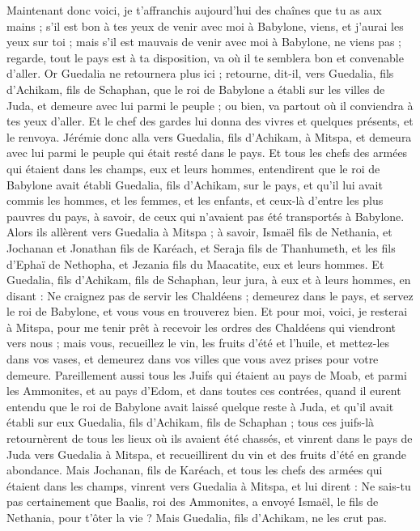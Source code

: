 \begin{multicols}{2}
Maintenant donc voici, je t'affranchis aujourd'hui des chaînes que tu as aux mains ; s'il est bon à tes yeux de venir avec moi à Babylone, viens, et j'aurai les yeux sur toi ; mais s'il est mauvais de venir avec moi à Babylone, ne viens pas ; regarde, tout le pays est à ta disposition, va où il te semblera bon et convenable d'aller.
Or Guedalia ne retournera plus ici ; retourne, dit-il, vers Guedalia, fils d'Achikam, fils de Schaphan, que le roi de Babylone a établi sur les villes de Juda, et demeure avec lui parmi le peuple ; ou bien, va partout où il conviendra à tes yeux d'aller. Et le chef des gardes lui donna des vivres et quelques présents, et le renvoya.
Jérémie donc alla vers Guedalia, fils d'Achikam, à Mitspa, et demeura avec lui parmi le peuple qui était resté dans le pays.
Et tous les chefs des armées qui étaient dans les champs, eux et leurs hommes, entendirent que le roi de Babylone avait établi Guedalia, fils d'Achikam, sur le pays, et qu'il lui avait commis les hommes, et les femmes, et les enfants, et ceux-là d'entre les plus pauvres du pays, à savoir, de ceux qui n'avaient pas été transportés à Babylone.
Alors ils allèrent vers Guedalia à Mitspa ; à savoir, Ismaël fils de Nethania, et Jochanan et Jonathan fils de Karéach, et Seraja fils de Thanhumeth, et les fils d'Ephaï de Nethopha, et Jezania fils du Maacatite, eux et leurs hommes.
Et Guedalia, fils d'Achikam, fils de Schaphan, leur jura, à eux et à leurs hommes, en disant : Ne craignez pas de servir les Chaldéens ; demeurez dans le pays, et servez le roi de Babylone, et vous vous en trouverez bien.
Et pour moi, voici, je resterai à Mitspa, pour me tenir prêt à recevoir les ordres des Chaldéens qui viendront vers nous ; mais vous, recueillez le vin, les fruits d'été et l'huile, et mettez-les dans vos vases, et demeurez dans vos villes que vous avez prises pour votre demeure.
Pareillement aussi tous les Juifs qui étaient au pays de Moab, et parmi les Ammonites, et au pays d'Edom, et dans toutes ces contrées, quand il eurent entendu que le roi de Babylone avait laissé quelque reste à Juda, et qu'il avait établi sur eux Guedalia, fils d'Achikam, fils de Schaphan ;
tous ces juifs-là retournèrent de tous les lieux où ils avaient été chassés, et vinrent dans le pays de Juda vers Guedalia à Mitspa, et recueillirent du vin et des fruits d'été en grande abondance.
Mais Jochanan, fils de Karéach, et tous les chefs des armées qui étaient dans les champs, vinrent vers Guedalia à Mitspa,
et lui dirent : Ne sais-tu pas certainement que Baalis, roi des Ammonites, a envoyé Ismaël, le fils de Nethania, pour t'ôter la vie ? Mais Guedalia, fils d'Achikam, ne les crut pas.

\end{multicols}
